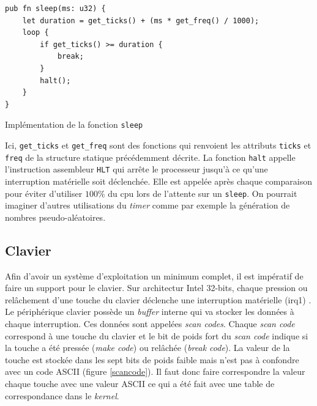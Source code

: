 \begin{code}
\begin{verbatim}
pub fn sleep(ms: u32) {
    let duration = get_ticks() + (ms * get_freq() / 1000);
    loop {
        if get_ticks() >= duration {
            break;
        }
        halt();
    }
}
\end{verbatim}
\caption{Implémentation de la fonction \texttt{sleep}}
\label{lst:timer:sleep}
\end{code} \bigbreak

Ici, \texttt{get_ticks} et \texttt{get_freq} sont des fonctions
qui renvoient les attributs \texttt{ticks} et \texttt{freq}
de la structure statique précédemment décrite. La fonction \texttt{halt}
appelle l'instruction assembleur \texttt{HLT} qui arrête le processeur
jusqu'à ce qu'une interruption matérielle soit déclenchée. Elle est appelée après
chaque comparaison pour éviter d'utiliser $100\%$ du \acrshort{cpu} lors de l'attente
sur un \texttt{sleep}. On pourrait imaginer d'autres utilisations du
\textit{timer} comme par exemple la génération de nombres pseudo-aléatoires.


\subsection{Clavier}
Afin d'avoir un système d'exploitation un minimum complet, il est impératif
de faire un support pour le clavier. Sur architectur Intel 32-bits, chaque
pression ou relâchement d'une touche du clavier déclenche une interruption
matérielle (\acrshort{irq}1) \cite{ref42}. Le périphérique clavier possède un
\textit{buffer} interne qui va stocker les données à chaque interruption. Ces données
sont appelées \textit{scan codes}. Chaque \textit{scan code} correspond à une
touche du clavier et le bit de poids fort du \textit{scan code} indique si
la touche a été pressée (\textit{make code}) ou relâchée (\textit{break code}).
La valeur de la touche est stockée dans les sept bits de poids faible mais n'est
pas à confondre avec un code ASCII (figure \ref{scancode}). Il faut donc faire
correspondre la valeur chaque touche avec une valeur ASCII ce qui a été fait avec
une table de correspondance dans le \textit{kernel}.

